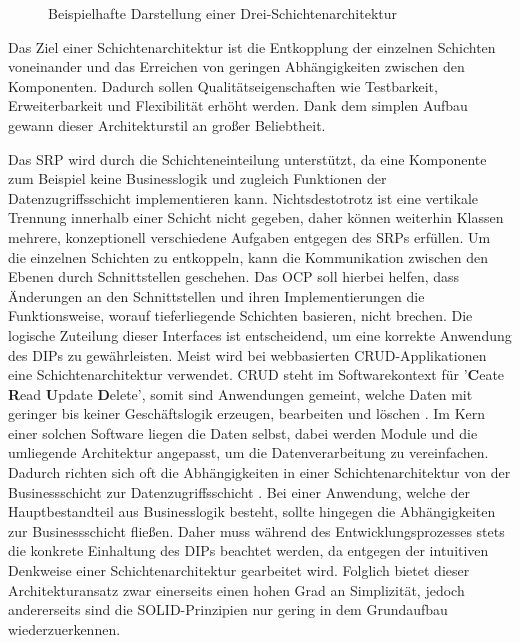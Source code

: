 \begin{figure}[htbp]
	\centering
	\large
	
	\caption{Beispielhafte Darstellung einer Drei-Schichtenarchitektur}
	\label{fig:Schichtenarchitektur}
\end{figure}

Das Ziel einer Schichtenarchitektur ist die Entkopplung der einzelnen Schichten voneinander und das Erreichen von geringen Abhängigkeiten zwischen den Komponenten. Dadurch sollen Qualitätseigenschaften wie Testbarkeit, Erweiterbarkeit und Flexibilität erhöht werden. Dank dem simplen Aufbau gewann dieser Architekturstil an großer Beliebtheit. 

Das \acrlong{SRP} wird durch die Schichteneinteilung unterstützt, da eine Komponente zum Beispiel keine Businesslogik und zugleich Funktionen der Datenzugriffsschicht implementieren kann. Nichtsdestotrotz ist eine vertikale Trennung innerhalb einer Schicht nicht gegeben, daher können weiterhin Klassen mehrere, konzeptionell verschiedene Aufgaben entgegen des SRPs erfüllen. Um die einzelnen Schichten zu entkoppeln, kann die Kommunikation zwischen den Ebenen durch Schnittstellen geschehen. Das \acrlong{OCP} soll hierbei helfen, dass Änderungen an den Schnittstellen und ihren Implementierungen die Funktionsweise, worauf tieferliegende Schichten basieren, nicht brechen. Die logische Zuteilung dieser Interfaces ist entscheidend, um eine korrekte Anwendung des \acrlong{DIP}s zu gewährleisten. Meist wird bei webbasierten CRUD-Applikationen eine Schichtenarchitektur verwendet. \acrshort{CRUD} steht im Softwarekontext für '\textbf{C}eate \textbf{R}ead \textbf{U}pdate \textbf{D}elete', somit sind Anwendungen gemeint, welche Daten mit geringer bis keiner Geschäftslogik erzeugen, bearbeiten und löschen \cite[S. 381]{Martin.1980}. Im Kern einer solchen Software liegen die Daten selbst, dabei werden Module und die umliegende Architektur angepasst, um die Datenverarbeitung zu vereinfachen. Dadurch richten sich oft die Abhängigkeiten in einer Schichtenarchitektur von der Businessschicht zur Datenzugriffsschicht \cite{Layered.SOLID}. Bei einer Anwendung, welche der Hauptbestandteil aus Businesslogik besteht, sollte hingegen die Abhängigkeiten zur Businessschicht fließen. Daher muss während des Entwicklungsprozesses stets die konkrete Einhaltung des DIPs beachtet werden, da entgegen der intuitiven Denkweise einer Schichtenarchitektur gearbeitet wird. Folglich bietet dieser Architekturansatz zwar einerseits einen hohen Grad an Simplizität, jedoch andererseits sind die SOLID-Prinzipien nur gering in dem Grundaufbau wiederzuerkennen.

